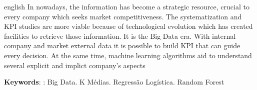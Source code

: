 \begin{resumo}[Abstract]
 \begin{otherlanguage*}{english}
In nowadays, the information has become a strategic resource, crucial to every company which seeks market competitiveness. The systematization and KPI studies are more viable because of technological evolution which has created facilities to retrieve those information. It is the Big Data era. With internal company and market external data it is possible to build KPI that can guide every decision. At the same time, machine learning algorithms aid to understand several explicit and implict company's aspects 

   \vspace{\onelineskip}
 
   \noindent 
   \textbf{Keywords}: : Big Data. K Médias. Regressão Logística. Random Forest
 \end{otherlanguage*}
\end{resumo}
